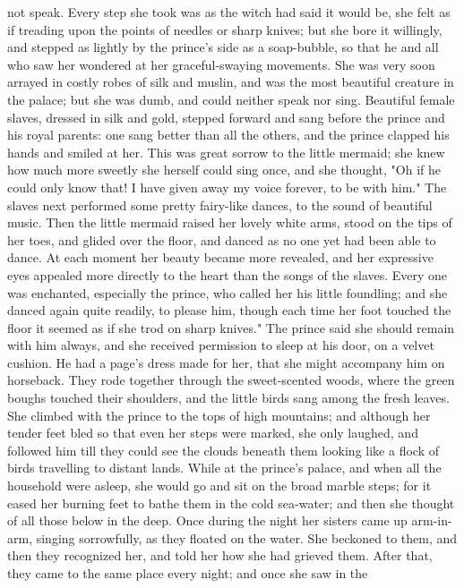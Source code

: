 not speak. Every step she took was as the witch had said it would
be, she felt as if treading upon the points of needles or sharp
knives; but she bore it willingly, and stepped as lightly by the
prince's side as a soap-bubble, so that he and all who saw her
wondered at her graceful-swaying movements. She was very soon
arrayed in costly robes of silk and muslin, and was the most beautiful
creature in the palace; but she was dumb, and could neither speak
nor sing.
    Beautiful female slaves, dressed in silk and gold, stepped forward
and sang before the prince and his royal parents: one sang better than
all the others, and the prince clapped his hands and smiled at her.
This was great sorrow to the little mermaid; she knew how much more
sweetly she herself could sing once, and she thought, "Oh if he
could only know that! I have given away my voice forever, to be with
him."
    The slaves next performed some pretty fairy-like dances, to the
sound of beautiful music. Then the little mermaid raised her lovely
white arms, stood on the tips of her toes, and glided over the
floor, and danced as no one yet had been able to dance. At each moment
her beauty became more revealed, and her expressive eyes appealed more
directly to the heart than the songs of the slaves. Every one was
enchanted, especially the prince, who called her his little foundling;
and she danced again quite readily, to please him, though each time
her foot touched the floor it seemed as if she trod on sharp knives."
    The prince said she should remain with him always, and she
received permission to sleep at his door, on a velvet cushion. He
had a page's dress made for her, that she might accompany him on
horseback. They rode together through the sweet-scented woods, where
the green boughs touched their shoulders, and the little birds sang
among the fresh leaves. She climbed with the prince to the tops of
high mountains; and although her tender feet bled so that even her
steps were marked, she only laughed, and followed him till they
could see the clouds beneath them looking like a flock of birds
travelling to distant lands. While at the prince's palace, and when
all the household were asleep, she would go and sit on the broad
marble steps; for it eased her burning feet to bathe them in the
cold sea-water; and then she thought of all those below in the deep.
    Once during the night her sisters came up arm-in-arm, singing
sorrowfully, as they floated on the water. She beckoned to them, and
then they recognized her, and told her how she had grieved them. After
that, they came to the same place every night; and once she saw in the
